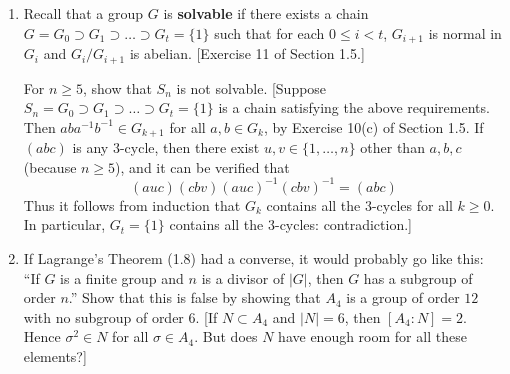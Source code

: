 \documentclass[leqno]{book}
\begin{document}
\begin{enumerate}
(f) Define a permutation in $S(X)$ to be \textbf{even} if it is the product of an even number of transpositions, and \textbf{odd} if it is the product of an odd number of transpositions.  By (c) every element of $S(X)$ is either even or odd, and by (e) no element of $S(X)$ is both even and odd.  Define $s:S(X)\to\mathbb Z/2\mathbb Z$ via $s(\sigma)=0$ if $\sigma$ is even and $1$ if $\sigma$ is odd.  Show that $s$ is a surjective homomorphism.  The kernel of $s$ is denoted $A(X)$ and is called the \textbf{alternating group with respect to $X$}.

If $X=\{1,2,\dots,n\}$, then $A(X)$ is alternatively denoted $A_n$, just as $S(X)$ is denoted $S_n$.

(g) $A(X)$ is generated by the $3$-cycles.  [Every element of $A(X)$ is the product of an even number of transpositions.  Now verify that $(ab)(ab)=1_X$, $(ab)(ac)=(acb)$ and $(ab)(cd)=(adb)(adc)$.]

(h) $A(X)$ is the only subgroup of $S(X)$ of index $2$.  [If $N\subset S(X)$ is a subgroup of index $2$, then Exercise 2 of Section 1.5 shows that $\sigma^2\in N$ for all $\sigma\in S(X)$.  Thus $N$ contains all the $3$-cycles (why?).  Use part (g).]

\item Recall that a group $G$ is \textbf{solvable} if there exists a chain $G=G_0\supset G_1\supset\dots\supset G_t=\{1\}$ such that for each $0\leqslant i<t$, $G_{i+1}$ is normal in $G_i$ and $G_i/G_{i+1}$ is abelian.  [Exercise 11 of Section 1.5.]

For $n\geqslant 5$, show that $S_n$ is not solvable.  [Suppose $S_n=G_0\supset G_1\supset\dots\supset G_t=\{1\}$ is a chain satisfying the above requirements.  Then $aba^{-1}b^{-1}\in G_{k+1}$ for all $a,b\in G_k$, by Exercise 10(c) of Section 1.5.  If $(abc)$ is any $3$-cycle, then there exist $u,v\in\{1,\dots,n\}$ other than $a,b,c$ (because $n\geqslant 5$), and it can be verified that
$$(auc)(cbv)(auc)^{-1}(cbv)^{-1}=(abc)$$
Thus it follows from induction that $G_k$ contains all the $3$-cycles for all $k\geqslant 0$.  In particular, $G_t=\{1\}$ contains all the $3$-cycles: contradiction.]

\item If Lagrange's Theorem (1.8) had a converse, it would probably go like this: ``If $G$ is a finite group and $n$ is a divisor of $|G|$, then $G$ has a subgroup of order $n$.''  Show that this is false by showing that $A_4$ is a group of order $12$ with no subgroup of order $6$.  [If $N\subset A_4$ and $|N|=6$, then $[A_4:N]=2$.  Hence $\sigma^2\in N$ for all $\sigma\in A_4$.  But does $N$ have enough room for all these elements?]


\end{enumerate}
\end{document}
